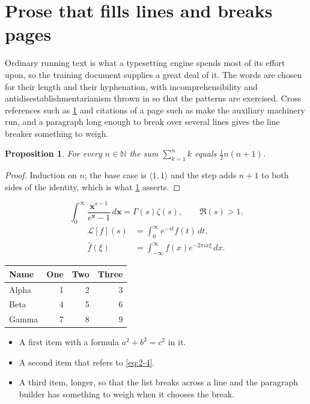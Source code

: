 \documentclass[11pt,a4paper]{report}
\theoremstyle{plain}
\newtheorem{proposition}{Proposition}[chapter]
\newcommand{\vecn}[1]{\mathbf{#1}}
\newcommand{\pairs}[2]{\langle #1,#2\rangle}
\begin{document}
\section{Prose that fills lines and breaks pages}
\label{sec:prose2-4}
Ordinary running text is what a typesetting engine spends most of its effort
upon, so the training document supplies a great deal of it. The words are
chosen for their length and their hyphenation, with incomprehensibility and
antidisestablishmentarianism thrown in so that the patterns are exercised.
Cross references such as \cref{sec:prose2-4} and citations of a page such
as \pageref{sec:prose2-4} make the auxiliary machinery run, and a
paragraph long enough to break over several lines gives the line breaker
something to weigh.
\begin{proposition}\label{prop:2-4}
For every $n\in\mathbb{N}$ the sum $\sum_{k=1}^{n}k$ equals
$\tfrac{1}{2}n(n+1)$.
\end{proposition}
\begin{proof}
Induction on $n$; the base case is $\pairs{1}{1}$ and the step adds $n+1$ to
both sides of the identity, which is what \cref{prop:2-4} asserts.
\end{proof}
\begin{equation}\label{eq:2-4}
  \int_{0}^{\infty}\frac{\vecn{x}^{s-1}}{e^{\vecn{x}}-1}\,d\vecn{x}
    = \Gamma(s)\zeta(s),\qquad \Re(s)>1 .
\end{equation}
\begin{align}
  \mathcal{L}[f](s) &= \int_{0}^{\infty} e^{-st} f(t)\,dt, \\
  \widehat{f}(\xi)  &= \int_{-\infty}^{\infty} f(x) e^{-2\pi i x\xi}\,dx .
\end{align}
\par\noindent\begin{center}
\begin{tabular}{lrrr}
\hline
Name & One & Two & Three \\
\hline
Alpha & 1 & 2 & 3 \\
Beta & 4 & 5 & 6 \\
Gamma & 7 & 8 & 9 \\
\hline
\end{tabular}
\end{center}
\begin{itemize}
  \item A first item with a formula $a^2+b^2=c^2$ in it.
  \item A second item that refers to \eqref{eq:2-4}.
  \item A third item, longer, so that the list breaks across a line and the
    paragraph builder has something to weigh when it chooses the break.
\end{itemize}
\end{document}
